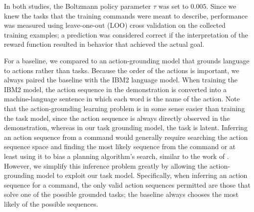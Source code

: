 \documentclass[conference]{IEEEtran}
\begin{document}
In both studies, the Boltzmann policy parameter $\tau$ was set to $0.005$. Since we knew the tasks that the training commands were meant to describe, performance was measured using leave-one-out (LOO) cross validation on the collected training examples; a prediction was considered correct if the interpretation of the reward function resulted in behavior that achieved the actual goal. 

For a baseline, we compared to an action-grounding model that grounds language to actions rather than tasks. Because the order of the actions is important, we always paired the baseline with the IBM2 language model. When training the IBM2 model, the action sequence in the demonstration is converted into a machine-language sentence in which each word is the name of the action. Note that the action-grounding learning problem is in some sense easier than training the task model, since the action sequence is always directly observed in the demonstration, whereas in our task grounding model, the task is latent.
Inferring an action sequence from a command would generally require searching the action sequence space and finding the most likely sequence from the command or at least using it to bias a planning algorithm's search, similar to the work of \citet{chen11}. However, we simplify this inference problem greatly by allowing the action-grounding model to exploit our task model. Specifically, when inferring an action sequence for a command, the only valid action sequences permitted are those that solve one of the possible grounded tasks; the baseline always chooses the most likely of the possible sequences.
\end{document}

